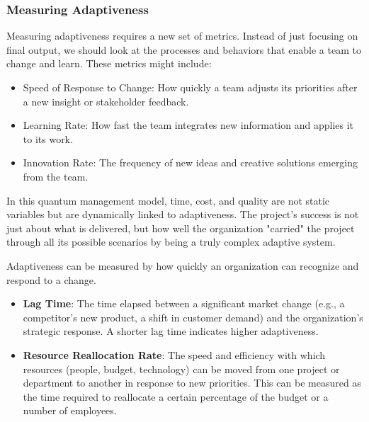 \documentclass{article}
\begin{document}
\subsubsection*{Measuring Adaptiveness}
Measuring adaptiveness requires a new set of metrics. Instead of just focusing on final output, we should look at the processes and behaviors that enable a team to change and learn. These metrics might include:
\begin{itemize}
\item Speed of Response to Change: How quickly a team adjusts its priorities after a new insight or stakeholder feedback.
\item Learning Rate: How fast the team integrates new information and applies it to its work.
\item Innovation Rate: The frequency of new ideas and creative solutions emerging from the team.
\end{itemize}

In this quantum management model, time, cost, and quality are not static variables but are dynamically linked to adaptiveness. The project's success is not just about what is delivered, but how well the organization "carried" the project through all its possible scenarios by being a truly complex adaptive system.

 
 Adaptiveness can be measured by how quickly an organization can recognize and respond to a change.
 \begin{itemize}
 	\item \textbf{Lag Time}: The time elapsed between a significant market change (e.g., a competitor's new product, a shift in customer demand) and the organization's strategic response. A shorter lag time indicates higher adaptiveness.
 	\item \textbf{Resource Reallocation Rate}: The speed and efficiency with which resources (people, budget, technology) can be moved from one project or department to another in response to new priorities. This can be measured as the time required to reallocate a certain percentage of the budget or a number of employees.
 \end{itemize}
 
\end{document}
